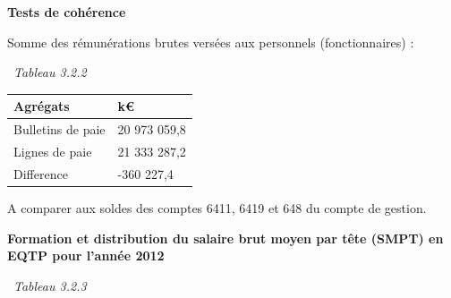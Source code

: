 \textbf{Tests de cohérence}

Somme des rémunérations brutes versées aux personnels (fonctionnaires) :

~\emph{Tableau 3.2.2}

\begin{longtable}[]{@{}ll@{}}
\toprule
Agrégats & k€\tabularnewline
\midrule
\endhead
Bulletins de paie & 20 973 059,8\tabularnewline
Lignes de paie & 21 333 287,2\tabularnewline
Difference & -360 227,4\tabularnewline
\bottomrule
\end{longtable}

A comparer aux soldes des comptes 6411, 6419 et 648 du compte de
gestion.

\textbf{Formation et distribution du salaire brut moyen par tête (SMPT)
en EQTP pour l'année 2012 }

~\emph{Tableau 3.2.3}

